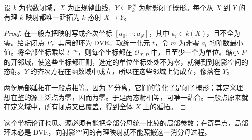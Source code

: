\begin{lemma}\label{b3:lem:H-rational-map-extension}
	设 \(k\) 为代数闭域，\(X\) 为正规整曲线，\(Y\subseteq\mathbb P_k^N\) 为射影闭子概形。每个从 \(X\) 到 \(Y\) 的有理 \(k\) 映射都唯一延拓为 \(k\) 态射 \(X\rightarrow Y\)。
\end{lemma}
\begin{proof}
	在一般点把映射写成齐次坐标 \([a_0:\cdots:a_N]\)，其中 \(a_i\in k(X)\)，且不全为零。给定闭点 \(P\)，其局部环为 DVR。取统一化元 \(t\)，令 \(m\) 为非零 \(a_i\) 的阶数最小值。将全部坐标乘以 \(t^{-m}\)，则每个坐标都在 \(\mathcal O_{X,P}\) 中，且至少一个为单位。缩小 \(P\) 的开邻域，使这些坐标都正则，选定的单位坐标处处不为零，就得到到射影空间的态射。\(Y\) 的齐次方程在函数域中成立，所以在这些邻域上仍成立，像落在 \(Y\)。

	两份局部延拓在一般点相等。因为 \(Y\) 分离，它们的等化子是闭子概形；其定义理想在整的源上泛点为零，因而为零。于是两态射相等，可唯一黏合。一般点原来就在定义域中，所有闭点又已覆盖，得到全体 \(X\) 上的延拓。
\end{proof}

这个坐标论证也见\cite[Chapter I, Proposition 6.8, pp. 43--44]{Hartshorne1977}。源必须有能把全部分母统一比较的局部参数；在奇异点，局部环未必是 DVR，向射影空间的有理映射就不能照搬这一消分母过程。

